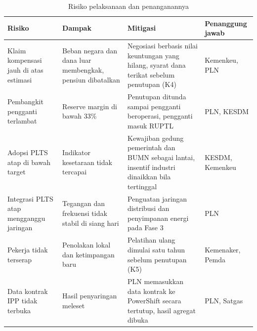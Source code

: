 \begin{table}[H]
\centering
\caption{Risiko pelaksanaan dan penanganannya}
\label{tab:risiko}
\small
\begin{tabularx}{\textwidth}{L{3cm} Y Y L{2.4cm}}
\toprule
Risiko & Dampak & Mitigasi & Penanggung jawab \\
\midrule
Klaim kompensasi jauh di atas estimasi & Beban negara dan dana luar membengkak, pensiun dibatalkan & Negosiasi berbasis nilai keuntungan yang hilang, syarat dana terikat sebelum penutupan (K4) & Kemenkeu, PLN \\
\addlinespace
Pembangkit pengganti terlambat & Reserve margin di bawah 33\% & Penutupan ditunda sampai pengganti beroperasi, pengganti masuk RUPTL & PLN, KESDM \\
\addlinespace
Adopsi PLTS atap di bawah target & Indikator kesetaraan tidak tercapai & Kewajiban gedung pemerintah dan BUMN sebagai lantai, insentif industri dinaikkan bila tertinggal & KESDM, Kemenkeu \\
\addlinespace
Integrasi PLTS atap mengganggu jaringan & Tegangan dan frekuensi tidak stabil di siang hari & Penguatan jaringan distribusi dan penyimpanan energi pada Fase 3 & PLN \\
\addlinespace
Pekerja tidak terserap & Penolakan lokal dan ketimpangan baru & Pelatihan ulang dimulai satu tahun sebelum penutupan (K5) & Kemenaker, Pemda \\
\addlinespace
Data kontrak IPP tidak terbuka & Hasil penyaringan meleset & PLN memasukkan data kontrak ke PowerShift secara tertutup, hasil agregat dibuka & PLN, Satgas \\
\bottomrule
\end{tabularx}
\end{table}
